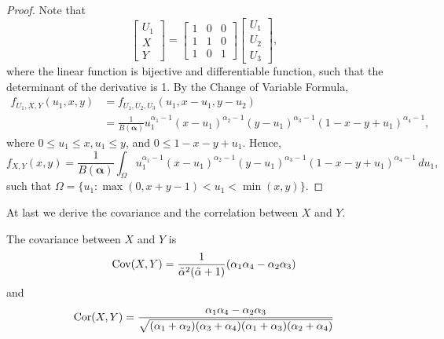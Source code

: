 \begin{proof}
  Note that
  $$
  \begin{bmatrix}
    U_1 \\ X \\ Y
  \end{bmatrix}  = \begin{bmatrix}
    1 & 0 & 0 \\
    1 & 1 & 0 \\
    1 & 0 & 1
  \end{bmatrix}\begin{bmatrix}
    U_1 \\ U_2 \\ U_3
  \end{bmatrix}, 
  $$
  where the linear function is bijective and differentiable function, such
  that the determinant of the derivative is 1. By the Change of Variable
  Formula, 
  \begin{equation}
    \begin{split}
      f_{U_1,X,Y}(u_1,x,y) &= f_{U_1,U_2,U_3}(u_1, x - u_1, y - u_2) \\ 
      &= \frac{1}{B(\boldsymbol{\alpha})}u_1^{\alpha_1-1}(x-u_1)^{\alpha_2-1}(y-u_1 )^{\alpha_3-1}(1-x-y+u_1)^{\alpha_4-1},
    \end{split}
  \end{equation}
  where $0 \le u_1 \le x, u_1 \le y$, and $0 \le 1 - x - y + u_1$.  
  Hence,
  \begin{equation}
      \label{eq:dist-X-Y}
      f_{X,Y}(x,y) = \frac{1}{B(\boldsymbol{\alpha})}\int_{\Omega} u_1^{\alpha_1-1}(x-u_1)^{\alpha_2-1}(y-u_1)^{\alpha_3-1}(1-x-y+u_1)^{\alpha_4-1} \, du_1,
  \end{equation}
  such that $\Omega = \{u_1 : \max(0, x + y -1) < u_1 < \min(x,y)\}$.
\end{proof}

At last we derive the covariance and the correlation between $X$ and $Y$.

\begin{proposition}
  \label{prop:covariance-correlation}
  The covariance between $X$ and $Y$ is 
  $$\operatorname{Cov}(X,Y) = \frac{1}{\tilde{\alpha}^2(\tilde{\alpha}+1)}(\alpha_1\alpha_4 - \alpha_2\alpha_3)$$
  and
  $$\operatorname{Cor}(X,Y) = \frac{\alpha_1\alpha_4 - \alpha_2\alpha_3}{\sqrt{(\alpha_1+\alpha_2)(\alpha_3+\alpha_4)(\alpha_1+\alpha_3)(\alpha_2+\alpha_4)}}$$
\end{proposition}

